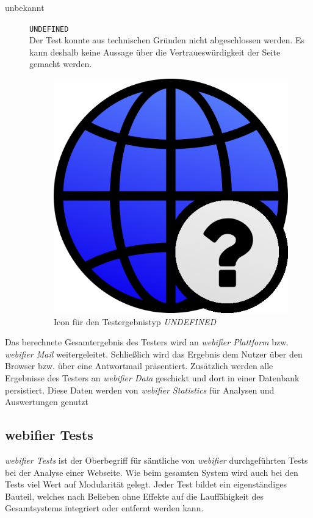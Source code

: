 \begin{description}
	\item[unbekannt] \hfill \texttt{UNDEFINED} \\
	Der Test konnte aus technischen Gründen nicht abgeschlossen werden.
	Es kann deshalb keine Aussage über die Vertraueswürdigkeit der Seite gemacht werden.
	\begin{figure}[H]
		\centering
		\includegraphics[scale=0.2]{images/webifier-undefined}
		\caption{Icon für den Testergebnistyp \textit{UNDEFINED}}
	\end{figure}
\end{description}

Das berechnete Gesamtergebnis des Testers wird an \textit{webifier Plattform} bzw. \textit{webifier
Mail} weitergeleitet. Schließlich wird das Ergebnis dem Nutzer über den Browser bzw.
über eine Antwortmail präsentiert. Zusätzlich werden alle Ergebnisse des Testers an \textit{webifier
Data} geschickt und dort in einer Datenbank persistiert. Diese Daten werden von \textit{webifier
Statistics} für Analysen und Auswertungen genutzt

\subsection{webifier Tests}
\textit{webifier Tests} ist der Oberbegriff für sämtliche von \textit{webifier} durchgeführten Tests
bei der Analyse einer Webseite. Wie beim gesamten System wird auch bei den Tests viel Wert
auf Modularität gelegt. Jeder Test bildet ein eigenständiges Bauteil, welches nach Belieben
ohne Effekte auf die Lauffähigkeit des Gesamtsystems integriert oder entfernt werden kann.

